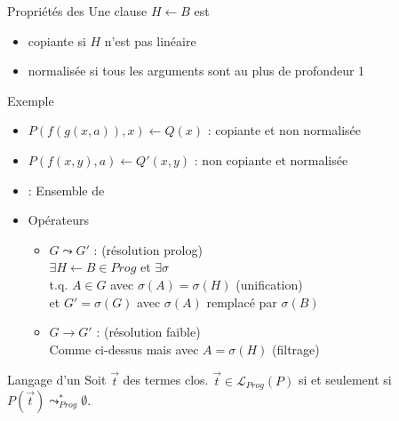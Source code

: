 \begin{frame}{\csclause}
  \begin{block}{Propriétés des \csclauses}
    Une clause $H \leftarrow B$ est
    \pause
    \begin{itemize}[<+->]
    \item copiante si $H$ n'est pas linéaire
    \item normalisée si tous les arguments sont au plus de profondeur 1
    \end{itemize}
  \end{block}
  \begin{exampleblock}{Exemple}
    \begin{itemize}
     \item $P(f(g(x,a)),x) \leftarrow Q(x)$ : copiante et non normalisée
     \item $P(f(x,y),a) \leftarrow Q'(x,y)$ : non copiante et normalisée
    \end{itemize}
  \end{exampleblock}
\end{frame}

\begin{frame}{\csprogramme}
  \begin{itemize}[<+->]
  \item \csprogramme : Ensemble de \csclauses
  \item Opérateurs
    \begin{itemize}
    \item $G \leadsto G'$ : (résolution prolog) \\
      $\exists H \leftarrow B \in Prog$ et $\exists \sigma$ \\
      t.q. $A \in G$ avec $\sigma(A) = \sigma(H)$ (unification)\\
      et $G' = \sigma(G)$ avec $\sigma(A)$ remplacé par $\sigma(B)$
    \item $G \rightarrow G'$ : (résolution faible) \\
      Comme ci-dessus mais avec $A = \sigma(H)$ (filtrage)
    \end{itemize}
  \end{itemize}
  \begin{block}{Langage d'un \csprogramme}
    Soit $\vec{t}$ des termes clos.
    $\vec{t} \in \mathcal{L}_{Prog}(P)$ si et seulement si $P(\vec{t}) \leadsto^*_{Prog} \emptyset$.
  \end{block}
\end{frame}

